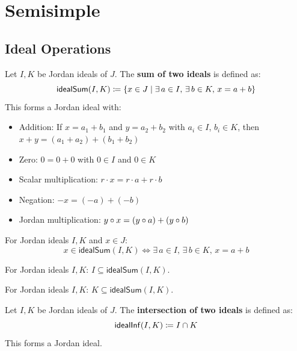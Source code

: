 \section{Semisimple}

\subsection{Ideal Operations}

\begin{definition}[idealSum]
Let $I, K$ be Jordan ideals of $J$. The \textbf{sum of two ideals} is defined as:
\[ \mathsf{idealSum}(I, K) \coloneqq \{ x \in J \mid \exists\, a \in I,\, \exists\, b \in K,\, x = a + b \} \]
This forms a Jordan ideal with:
\begin{itemize}
  \item Addition: If $x = a_1 + b_1$ and $y = a_2 + b_2$ with $a_i \in I$, $b_i \in K$, then $x + y = (a_1 + a_2) + (b_1 + b_2)$
  \item Zero: $0 = 0 + 0$ with $0 \in I$ and $0 \in K$
  \item Scalar multiplication: $r \cdot x = r \cdot a + r \cdot b$
  \item Negation: $-x = (-a) + (-b)$
  \item Jordan multiplication: $y \circ x = (y \circ a) + (y \circ b)$
\end{itemize}
\end{definition}

\begin{lemma}
For Jordan ideals $I, K$ and $x \in J$:
\[ x \in \mathsf{idealSum}(I, K) \iff \exists\, a \in I,\, \exists\, b \in K,\, x = a + b \]
\end{lemma}

\begin{lemma}
For Jordan ideals $I, K$: $I \subseteq \mathsf{idealSum}(I, K)$.
\end{lemma}

\begin{lemma}
For Jordan ideals $I, K$: $K \subseteq \mathsf{idealSum}(I, K)$.
\end{lemma}

\begin{definition}[idealInf]
Let $I, K$ be Jordan ideals of $J$. The \textbf{intersection of two ideals} is defined as:
\[ \mathsf{idealInf}(I, K) \coloneqq I \cap K \]
This forms a Jordan ideal.
\end{definition}

